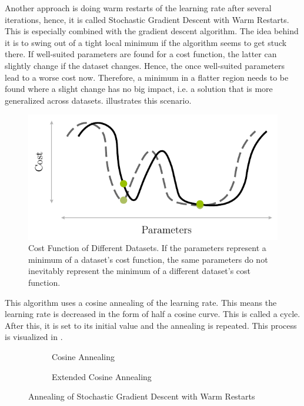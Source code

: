 Another approach is doing warm restarts of the learning rate after several iterations, hence, it is called Stochastic Gradient Descent with Warm Restarts\cite{DBLP:journals/corr/LoshchilovH16a}.
This is especially combined with the gradient descent algorithm.
The idea behind it is to swing out of a tight local minimum if the algorithm seems to get stuck there.
If well-suited parameters are found for a cost function, the latter can slightly change if the dataset changes.
Hence, the once well-suited parameters lead to a worse cost now.
Therefore, a minimum in a flatter region needs to be found where a slight change has no big impact, i.e. a solution that is more generalized across datasets.
 illustrates this scenario.
\begin{figure}
	\centering
	\includegraphics[]{images/sgdr-cost.pdf}
	\caption[Cost Function of Different Datasets]{Cost Function of Different Datasets. If the parameters represent a minimum of a dataset's cost function, the same parameters do not inevitably represent the minimum of a different dataset's cost function.}
	\label{fig:sgdr-cost}
\end{figure}
This algorithm uses a cosine annealing of the learning rate.
This means the learning rate is decreased in the form of half a cosine curve.
This is called a cycle.
After this, it is set to its initial value and the annealing is repeated.
This process is visualized in .
\begin{figure}
	\setlength{}
	\setlength{}
	\centering
	\begin{subfigure}{.49\textwidth}
		\centering
		
		\caption{Cosine Annealing}
		\label{fig:sgdr-annealing-normal}
	\end{subfigure}%
	\setlength{}
	\begin{subfigure}{.49\textwidth}
		\centering
		
		\caption{Extended Cosine Annealing}
		\label{fig:sgdr-annealing-extended}
	\end{subfigure}
	\caption{Annealing of Stochastic Gradient Descent with Warm Restarts}
	\label{fig:sgdr-annealing}
\end{figure}
